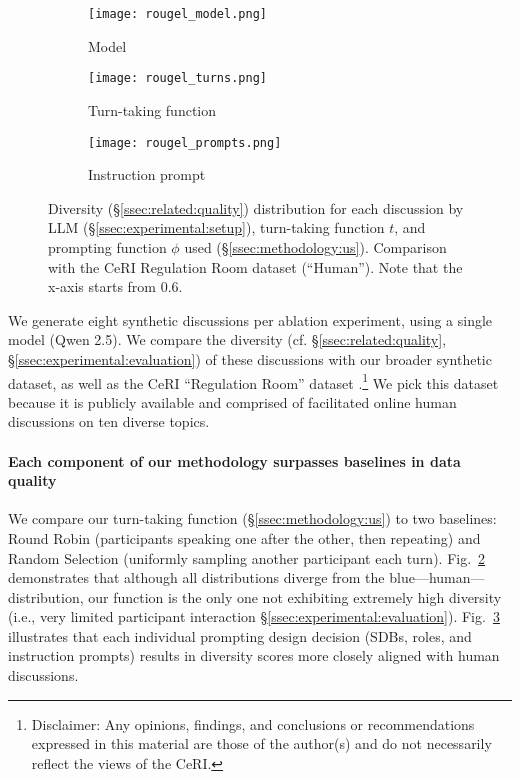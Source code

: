 \begin{figure*}[t]
    \begin{subfigure}{0.32\linewidth}
        \texttt{[image: rougel\_model.png]}
        \caption{Model}
        \label{fig:rougel_model}
    \end{subfigure}%
    \hfill
    \begin{subfigure}{0.32\linewidth}
        \texttt{[image: rougel\_turns.png]}
        \caption{Turn-taking function}
        \label{fig:rougel_turns}
    \end{subfigure}%
    \hfill
    \begin{subfigure}{0.32\linewidth}
        \texttt{[image: rougel\_prompts.png]}
        \caption{Instruction prompt}
        \label{fig:rougel_prompts}
    \end{subfigure}%

    \caption{Diversity (\S\ref{ssec:related:quality}) distribution for each discussion by LLM (\S\ref{ssec:experimental:setup}), turn-taking function $t$, and prompting function $\phi$ used (\S\ref{ssec:methodology:us}). Comparison with the CeRI Regulation Room dataset (``Human''). Note that the x-axis starts from $0.6$.}
    \label{fig:diversity}
\end{figure*}

We generate eight synthetic discussions per ablation experiment, using a single model (Qwen 2.5). We compare the diversity (cf. \S\ref{ssec:related:quality}, \S\ref{ssec:experimental:evaluation}) of these discussions with our broader synthetic dataset, as well as the CeRI “Regulation Room” dataset .\footnote{Disclaimer: Any opinions, findings, and conclusions or recommendations expressed in this material are those of the author(s) and do not necessarily reflect the views of the CeRI.} We pick this dataset because it is publicly available and comprised of facilitated online human discussions on ten diverse topics.

\paragraph{Each component of our methodology surpasses baselines in data quality} We compare our turn-taking function (\S\ref{ssec:methodology:us}) to two baselines: Round Robin (participants speaking one after the other, then repeating) and Random Selection (uniformly sampling another participant each turn). Fig.~\ref{fig:rougel_turns} demonstrates that although all distributions diverge from the blue—human—distribution, our function is the only one not exhibiting extremely high diversity (i.e., very limited participant interaction \S\ref{ssec:experimental:evaluation}). Fig.~\ref{fig:rougel_prompts} illustrates that each individual prompting design decision (SDBs, roles, and instruction prompts) results in diversity scores more closely aligned with human discussions.

